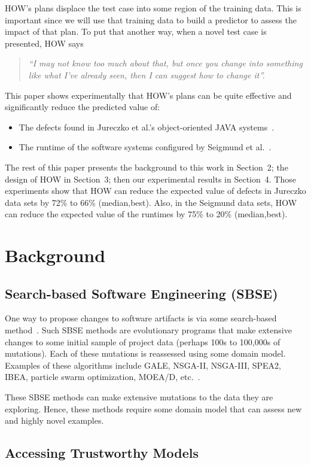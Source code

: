 \documentclass[conference]{IEEEtran}
\newcommand{\bi}{\begin{itemize}}
\newcommand{\ei}{\end{itemize}}
\begin{document}
HOW's  plans displace the test case into some region
of the training data. This is important since we will use that training data
to build a predictor to assess the impact of that plan.
To put that another way, when a novel test case is presented,
HOW says 
\begin{quote}{\em ``I may not know too much about that, but once you change into something like
what I've already seen, then I can suggest how to change it''.}
\end{quote}
This paper shows experimentally  that   HOW's plans can be quite effective and 
 significantly reduce the  predicted
value of:
\bi
\item The  defects found  in Jureczko et al.'s    object-oriented JAVA systems~\cite{jureczko10}.
\item The runtime of the  software systems   configured by  Seigmund et al.~\cite{sven12}.
\ei 
The rest of this paper presents the background to this work in Section~2; the design of HOW in Section~3;
then our experimental results  in Section~4. Those experiments show that HOW can   reduce the expected
value of defects in Jureczko   data sets by 72\% to 66\%  (median,best).
Also, in the Seigmund data sets, HOW can   reduce the expected value of the runtimes by  75\% to 20\% (median,best).


\section{Background}
\subsection{Search-based Software Engineering (SBSE)}
One way to propose changes to software artifacts
is   via some search-based method~\cite{Harman2009,Harman2011}. Such SBSE methods are   evolutionary programs that 
make
 extensive changes to  some initial sample of project data
 (perhaps 
100s to 100,000s of mutations). Each of these mutations
is reassessed using some domain model.
Examples of these algorithms include GALE, NSGA-II, NSGA-III, SPEA2, IBEA, particle swarm optimization, MOEA/D, etc.~\cite{krall14,deb00a,zit02,zit04,%
deb14,Cui2005a,zhang07:TEC}.


These SBSE methods can make extensive mutations to the data they are exploring. Hence, these methods
require some domain model that can assess new and highly novel examples.
 

\subsection{Accessing Trustworthy Models}
\end{document}
